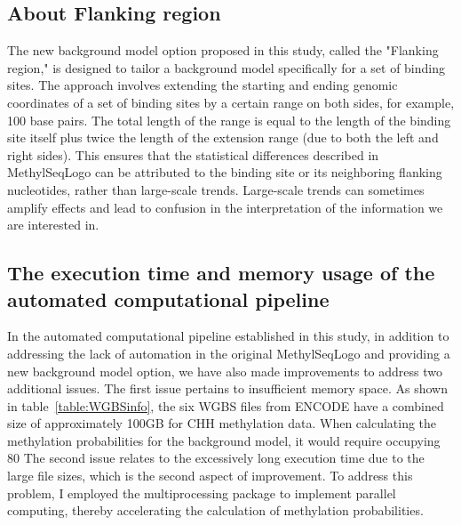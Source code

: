 \documentclass{PHlab-thesis}
\begin{document}
\subsection{About Flanking region}
The new background model option proposed in this study, called the "Flanking region," is designed to tailor a background model specifically for a set of binding sites. The approach involves extending the starting and ending genomic coordinates of a set of binding sites by a certain range on both sides, for example, 100 base pairs. The total length of the range is equal to the length of the binding site itself plus twice the length of the extension range (due to both the left and right sides). This ensures that the statistical differences described in MethylSeqLogo can be attributed to the binding site or its neighboring flanking nucleotides, rather than large-scale trends. Large-scale trends can sometimes amplify effects and lead to confusion in the interpretation of the information we are interested in.
\subsection{The execution time and memory usage of the automated computational pipeline }
In the automated computational pipeline established in this study, in addition to addressing the lack of automation in the original MethylSeqLogo and providing a new background model option, we have also made improvements to address two additional issues. The first issue pertains to insufficient memory space. As shown in table~\ref{table:WGBSinfo}, the six WGBS files from ENCODE have a combined size of approximately 100GB for CHH methylation data. When calculating the methylation probabilities for the background model, it would require occupying 80%
The second issue relates to the excessively long execution time due to the large file sizes, which is the second aspect of improvement. To address this problem, I employed the multiprocessing package to implement parallel computing, thereby accelerating the calculation of methylation probabilities.
	
\end{document}
